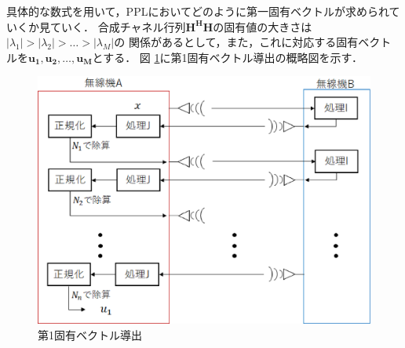 具体的な数式を用いて，PPLにおいてどのように第一固有ベクトルが求められていくか見ていく．
合成チャネル行列$\bm{H^HH}$の固有値の大きさは$|\lambda_1|>|\lambda_2|>\ldots>|\lambda_M|$の
関係があるとして，また，これに対応する固有ベクトルを$\bm{u_1},\bm{u_2},\ldots,\bm{u_M}$とする．
図 \ref{figProcIJ1}に第1固有ベクトル導出の概略図を示す．
\begin{figure}[t]
    \centering
    \includegraphics[width=0.7\linewidth]{chapter3/figure/ProcIJ1.eps}
    \caption{第1固有ベクトル導出}
    \label{figProcIJ1}
\end{figure}

